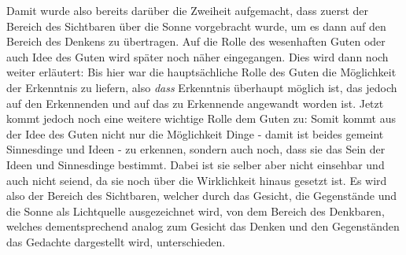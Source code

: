 Damit wurde also bereits darüber die Zweiheit aufgemacht, dass zuerst der Bereich des Sichtbaren über die Sonne vorgebracht wurde, um es dann auf den Bereich des Denkens zu übertragen.  
Auf die Rolle des wesenhaften Guten oder auch Idee des Guten wird später noch näher eingegangen. 
Dies wird dann noch weiter erläutert:
Bis hier war die hauptsächliche Rolle des Guten die Möglichkeit der Erkenntnis zu liefern, also \emph{dass} Erkenntnis überhaupt möglich ist, das jedoch auf den Erkennenden und auf das zu Erkennende angewandt worden ist. Jetzt kommt jedoch noch eine weitere wichtige Rolle dem Guten zu:
Somit kommt aus der Idee des Guten nicht nur die Möglichkeit Dinge - damit ist beides gemeint Sinnesdinge und Ideen - zu erkennen, sondern auch noch, dass sie das Sein der Ideen und Sinnesdinge bestimmt. Dabei ist sie selber aber nicht einsehbar und auch nicht seiend, da sie noch über die Wirklichkeit hinaus gesetzt ist. 
Es wird also der Bereich des Sichtbaren, welcher durch das Gesicht, die Gegenstände und die Sonne als Lichtquelle ausgezeichnet wird, von dem Bereich des Denkbaren, welches dementsprechend analog zum Gesicht das Denken und den Gegenständen das Gedachte dargestellt wird, unterschieden. 
